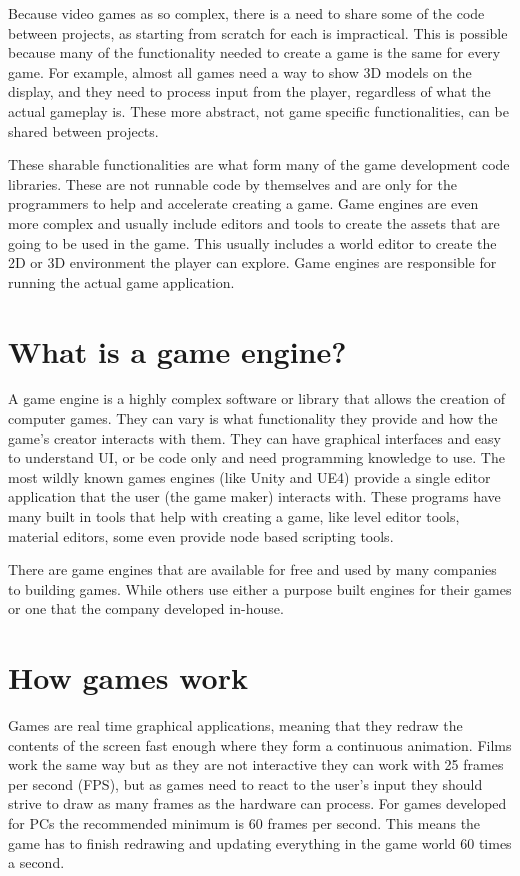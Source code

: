 Because video games as so complex, there is a need to share some of the code between projects, as starting from scratch for each is impractical. This is possible because many of the functionality needed to create a game is the same for every game. For example, almost all games need a way to show 3D models on the display, and they need to process input from the player, regardless of what the actual gameplay is. These more abstract, not game specific functionalities, can be shared between projects.

These sharable functionalities are what form many of the game development code libraries. These are not runnable code by themselves and are only for the programmers to help and accelerate creating a game. Game engines are even more complex and usually include editors and tools to create the assets that are going to be used in the game. This usually includes a world editor to create the 2D or 3D environment the player can explore. Game engines are responsible for running the actual game application.


\section{What is a game engine?}
A game engine is a highly complex software or library that allows the creation of computer games. They can vary is what functionality they provide and how the game's creator interacts with them. They can have graphical interfaces and easy to understand UI, or be code only and need programming knowledge to use. The most wildly known games engines (like Unity and UE4) provide a single editor application that the user (the game maker) interacts with. These programs have many built in tools that help with creating a game, like level editor tools, material editors, some even provide node based scripting tools.

There are game engines that are available for free and used by many companies to building games. While others use either a purpose built engines for their games or one that the company developed in-house.


\section{How games work}
Games are real time graphical applications, meaning that they redraw the contents of the screen fast enough where they form a continuous animation. Films work the same way but as they are not interactive they can work with 25 frames per second (FPS), but as games need to react to the user's input they should strive to draw as many frames as the hardware can process. For games developed for PCs the recommended minimum is 60 frames per second. This means the game has to finish redrawing and updating everything in the game world 60 times a second.

